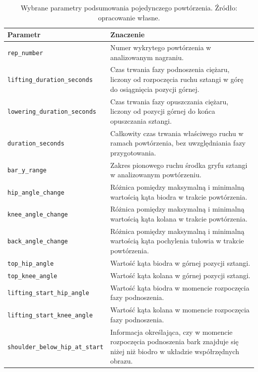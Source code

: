 \begin{table}[H]
\centering
\caption{Wybrane parametry podsumowania pojedynczego powtórzenia. Źródło: opracowanie własne.}
\label{tab:parametry-podsumowania-powtorzenia}
\vspace{0.3cm}
\small
\begin{tabular}{p{5.6cm}p{8.4cm}}
\toprule
\addlinespace[0.3em]
\textbf{Parametr} & \textbf{Znaczenie} \\
\midrule
\texttt{rep\_number} & Numer wykrytego powtórzenia w analizowanym nagraniu. \\

\texttt{lifting\_duration\_seconds} & Czas trwania fazy podnoszenia ciężaru, liczony od rozpoczęcia ruchu sztangi w górę do osiągnięcia pozycji górnej. \\

\texttt{lowering\_duration\_seconds} & Czas trwania fazy opuszczania ciężaru, liczony od pozycji górnej do końca opuszczania sztangi. \\

\texttt{duration\_seconds} & Całkowity czas trwania właściwego ruchu w ramach powtórzenia, bez uwzględniania fazy przygotowania. \\

\texttt{bar\_y\_range} & Zakres pionowego ruchu środka gryfu sztangi w analizowanym powtórzeniu. \\

\texttt{hip\_angle\_change} & Różnica pomiędzy maksymalną i minimalną wartością kąta biodra w trakcie powtórzenia. \\

\texttt{knee\_angle\_change} & Różnica pomiędzy maksymalną i minimalną wartością kąta kolana w trakcie powtórzenia. \\

\texttt{back\_angle\_change} & Różnica pomiędzy maksymalną i minimalną wartością kąta pochylenia tułowia w trakcie powtórzenia. \\

\texttt{top\_hip\_angle} & Wartość kąta biodra w górnej pozycji sztangi. \\

\texttt{top\_knee\_angle} & Wartość kąta kolana w górnej pozycji sztangi. \\

\texttt{lifting\_start\_hip\_angle} & Wartość kąta biodra w momencie rozpoczęcia fazy podnoszenia. \\

\texttt{lifting\_start\_knee\_angle} & Wartość kąta kolana w momencie rozpoczęcia fazy podnoszenia. \\

\texttt{shoulder\_below\_hip\_at\_start} & Informacja określająca, czy w momencie rozpoczęcia podnoszenia bark znajduje się niżej niż biodro w układzie współrzędnych obrazu. \\
\bottomrule
\end{tabular}
\end{table}


